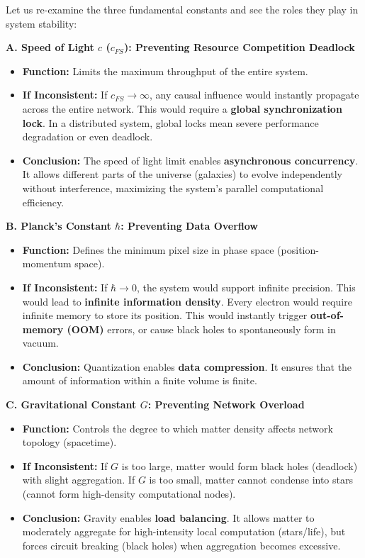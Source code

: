 \documentclass[11pt,a4paper,twoside]{book}
\begin{document}
Let us re-examine the three fundamental constants and see the roles they play in system stability:

\textbf{A. Speed of Light $c$ ($c_{FS}$): Preventing Resource Competition Deadlock}

\begin{itemize}
\item \textbf{Function:} Limits the maximum throughput of the entire system.

\item \textbf{If Inconsistent:} If \textbf{$c_{FS} \to \infty$}, any causal influence would instantly propagate across the entire network. This would require a \textbf{global synchronization lock}. In a distributed system, global locks mean severe performance degradation or even deadlock.

\item \textbf{Conclusion:} The speed of light limit enables \textbf{asynchronous concurrency}. It allows different parts of the universe (galaxies) to evolve independently without interference, maximizing the system's parallel computational efficiency.
\end{itemize}

\textbf{B. Planck's Constant $\hbar$: Preventing Data Overflow}

\begin{itemize}
\item \textbf{Function:} Defines the minimum pixel size in phase space (position-momentum space).

\item \textbf{If Inconsistent:} If \textbf{$\hbar \to 0$}, the system would support infinite precision. This would lead to \textbf{infinite information density}. Every electron would require infinite memory to store its position. This would instantly trigger \textbf{out-of-memory (OOM)} errors, or cause black holes to spontaneously form in vacuum.

\item \textbf{Conclusion:} Quantization enables \textbf{data compression}. It ensures that the amount of information within a finite volume is finite.
\end{itemize}

\textbf{C. Gravitational Constant $G$: Preventing Network Overload}

\begin{itemize}
\item \textbf{Function:} Controls the degree to which matter density affects network topology (spacetime).

\item \textbf{If Inconsistent:} If \textbf{$G$} is too large, matter would form black holes (deadlock) with slight aggregation. If \textbf{$G$} is too small, matter cannot condense into stars (cannot form high-density computational nodes).

\item \textbf{Conclusion:} Gravity enables \textbf{load balancing}. It allows matter to moderately aggregate for high-intensity local computation (stars/life), but forces circuit breaking (black holes) when aggregation becomes excessive.
\end{itemize}
\end{document}
